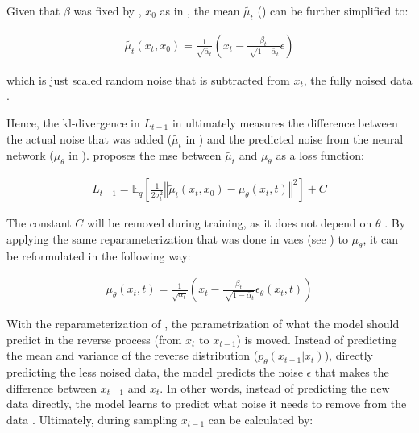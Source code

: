 \noindent Given that $\beta$ was fixed by \textcite{ho2020DenoisingDiffusionProbabilistic}, $x_0$ as in , the mean $\tilde{\mu_t}$ () can be further simplified to:

\begin{equation}
  \begin{align}
    \label{eqn:lt-1_3}
    \tilde{\mu_t}(x_t, x_0) = \frac{1}{\sqrt{\bar{\alpha}_t}}(x_t - \frac{\beta_t}{\sqrt[]{1-\bar{\alpha}_t}}\epsilon)
  \end{align}
\end{equation}

\noindent which is just scaled random noise that is subtracted from $x_t$, the fully noised data \cite{ho2020DenoisingDiffusionProbabilistic}.

Hence, the \gls{kl}-divergence in $L_{t-1}$ in  ultimately measures the difference between the actual noise that was added ($\tilde{\mu_t}$ in ) and the predicted noise from the neural network ($\mu_\theta$ in ).
\textcite{ho2020DenoisingDiffusionProbabilistic} proposes the \gls{mse} between $\tilde{\mu_t}$ and $\mu_\theta$ as a loss function:

\begin{equation}
  \begin{align}
    \label{eqn:mse_loss}
    L_{t-1} = \mathbb{E}_q \left[ \frac{1}{2\sigma_t^2} \left\Vert \tilde{\mu}_t(x_t, x_0) - \mu_\theta(x_t, t) \right\Vert^2 \right] + C
  \end{align}
\end{equation}

\noindent The constant $C$ will be removed during training, as it does not depend on $\theta$ \cite{ho2020DenoisingDiffusionProbabilistic}.
By applying the same reparameterization that was done in \glspl{vae} (see ) to $\mu_\theta$, it can be reformulated in the following way:

\begin{equation}
  \begin{align}
    \label{eqn:mse_loss_2}
    \mu_\theta(x_t,t)= \frac{1}{\sqrt{\alpha_t}}(x_t - \frac{\beta_t}{\sqrt[]{1-\bar{\alpha}_t}}\epsilon_\theta(x_t,t)) 
  \end{align}
\end{equation}

With the reparameterization of , the parametrization of what the model should predict in the reverse process (from $x_t$ to $x_{t-1}$) is moved. 
Instead of predicting the mean and variance of the reverse distribution ($p_\theta(x_{t-1}|x_t)$), \ie directly predicting the less noised data, 
the model predicts the noise $\epsilon$ that makes the difference between $x_{t-1}$ and ${x_t}$.
In other words, instead of predicting the new data directly, the model learns to predict what noise it needs to remove from the data \cite{capel2022MasterThesisDenoising}.
Ultimately, during sampling $x_{t-1}$ can be calculated by:

